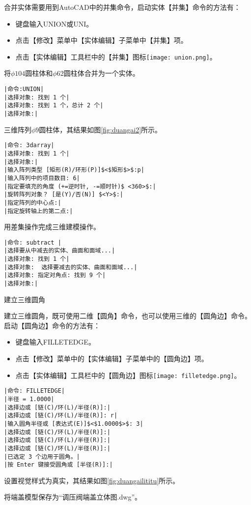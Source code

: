 \begin{procedure}
合并实体需要用到AutoCAD中的并集命令，启动实体【并集】命令的方法有：
\begin{itemize}
\item 键盘输入UNION或UNI。
\item 点击【修改】菜单中【实体编辑】子菜单中【并集】项。
\item 点击【实体编辑】工具栏中的【并集】图标\texttt{[image: union.png]}。
\end{itemize}
将$\phi 104$圆柱体和$\phi 62$圆柱体合并为一个实体。
\begin{lstlisting}
|命令:UNION|
|选择对象: 找到 1 个|
|选择对象: 找到 1 个，总计 2 个|
|选择对象:|
\end{lstlisting}
\item 三维阵列$\phi 9$圆柱体，其结果如图\ref{fig:duangai2}所示。
\begin{lstlisting}
|命令: 3darray|
|选择对象: 找到 1 个|
|选择对象:|
|输入阵列类型 [矩形(R)/环形(P)]$<$矩形$>$:p|
|输入阵列中的项目数目: 6|
|指定要填充的角度 (+=逆时针, -=顺时针)$ <360>$:|
|旋转阵列对象？ [是(Y)/否(N)] $<Y>$:|
|指定阵列的中心点:|
|指定旋转轴上的第二点:|
\end{lstlisting}
\item 用差集操作完成三维建模操作。
\begin{lstlisting}
|命令: subtract |
|选择要从中减去的实体、曲面和面域...|
|选择对象: 找到 1 个|
|选择对象:  选择要减去的实体、曲面和面域...|
|选择对象: 指定对角点: 找到 9 个|
|选择对象:|
\end{lstlisting}
\item 建立三维圆角

建立三维圆角，既可使用二维【圆角】命令，也可以使用三维的【圆角边】命令。启动【圆角边】命令的方法有：
\begin{itemize}
\item 键盘输入FILLETEDGE。
\item 点击【修改】菜单中的【实体编辑】子菜单中的【圆角边】项。
\item 点击【实体编辑】工具栏中的【圆角边】图标\texttt{[image: filletedge.png]}。
\end{itemize} 

\begin{lstlisting}
|命令: FILLETEDGE|
|半径 = 1.0000|
|选择边或 [链(C)/环(L)/半径(R)]:|
|选择边或 [链(C)/环(L)/半径(R)]: r|
|输入圆角半径或 [表达式(E)]$<$1.0000$>$: 3|
|选择边或 [链(C)/环(L)/半径(R)]:|  
|选择边或 [链(C)/环(L)/半径(R)]:|
|选择边或 [链(C)/环(L)/半径(R)]:|
|已选定 3 个边用于圆角。|
|按 Enter 键接受圆角或 [半径(R)]:|
\end{lstlisting}
\item 设置视觉样式为真实，其结果如图\ref{fig:duangailititu}所示。
\item 将端盖模型保存为“调压阀端盖立体图.dwg”。
\end{procedure}
